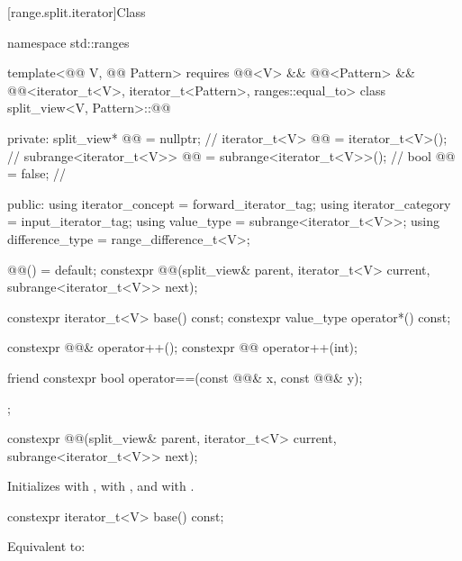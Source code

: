 [range.split.iterator]{Class }

\begin{codeblock}
namespace std::ranges {
  template<@@ V, @@ Pattern>
    requires @@<V> && @@<Pattern> &&
             @@<iterator_t<V>, iterator_t<Pattern>, ranges::equal_to>
  class split_view<V, Pattern>::@@ {
  private:
    split_view* @@ = nullptr;                              // \expos
    iterator_t<V> @@ = iterator_t<V>();                       // \expos
    subrange<iterator_t<V>> @@ = subrange<iterator_t<V>>();  // \expos
    bool @@ = false;                               // \expos

  public:
    using iterator_concept = forward_iterator_tag;
    using iterator_category = input_iterator_tag;
    using value_type = subrange<iterator_t<V>>;
    using difference_type = range_difference_t<V>;

    @@() = default;
    constexpr @@(split_view& parent, iterator_t<V> current, subrange<iterator_t<V>> next);

    constexpr iterator_t<V> base() const;
    constexpr value_type operator*() const;

    constexpr @@& operator++();
    constexpr @@ operator++(int);

    friend constexpr bool operator==(const @@& x, const @@& y);
  };
}
\end{codeblock}

\begin{itemdecl}
constexpr @@(split_view& parent, iterator_t<V> current, subrange<iterator_t<V>> next);
\end{itemdecl}

\begin{itemdescr}
\pnum
\effects
Initializes  with ,
 with , and
 with .
\end{itemdescr}

\begin{itemdecl}
constexpr iterator_t<V> base() const;
\end{itemdecl}

\begin{itemdescr}
\pnum
\effects
Equivalent to: 
\end{itemdescr}

